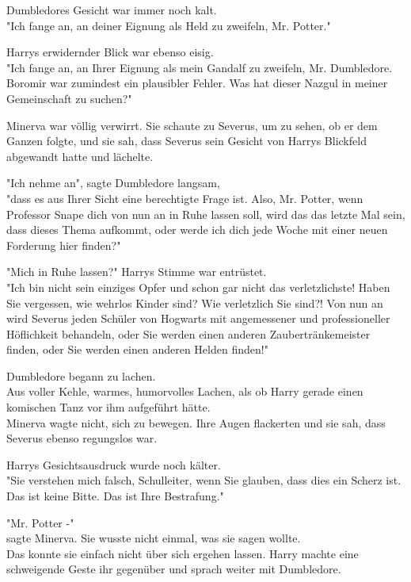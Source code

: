 {Dumbledores Gesicht war immer noch kalt.\\ "Ich fange an, an deiner Eignung als Held zu zweifeln, Mr. Potter."

Harrys erwidernder Blick war ebenso eisig.\\ "Ich fange an, an Ihrer Eignung als mein Gandalf zu zweifeln, Mr. Dumbledore. Boromir war zumindest ein plausibler Fehler. Was hat dieser Nazgul in meiner Gemeinschaft zu suchen?"

Minerva war völlig verwirrt. Sie schaute zu Severus, um zu sehen, ob er dem Ganzen folgte, und sie sah, dass Severus sein Gesicht von Harrys Blickfeld abgewandt hatte und lächelte.

"Ich nehme an", sagte Dumbledore langsam,\\ "dass es aus Ihrer Sicht eine berechtigte Frage ist. Also, Mr. Potter, wenn Professor Snape dich von nun an in Ruhe lassen soll, wird das das letzte Mal sein, dass dieses Thema aufkommt, oder werde ich dich jede Woche mit einer neuen Forderung hier finden?"

"Mich in Ruhe lassen?" Harrys Stimme war entrüstet.\\ "Ich bin nicht sein einziges Opfer und schon gar nicht das verletzlichste! Haben Sie vergessen, wie wehrlos Kinder sind? Wie verletzlich Sie sind?! Von nun an wird Severus jeden Schüler von Hogwarts mit angemessener und professioneller Höflichkeit behandeln, oder Sie werden einen anderen Zaubertränkemeister finden, oder Sie werden einen anderen Helden finden!"

Dumbledore begann zu lachen.\\ Aus voller Kehle, warmes, humorvolles Lachen, als ob Harry gerade einen komischen Tanz vor ihm aufgeführt hätte.\\ Minerva wagte nicht, sich zu bewegen. Ihre Augen flackerten und sie sah, dass Severus ebenso regungslos war.

Harrys Gesichtsausdruck wurde noch kälter.\\ "Sie verstehen mich falsch, Schulleiter, wenn Sie glauben, dass dies ein Scherz ist.\\ Das ist keine Bitte. Das ist Ihre Bestrafung."

"Mr. Potter -"\\ sagte Minerva. Sie wusste nicht einmal, was sie sagen wollte.\\ Das konnte sie einfach nicht über sich ergehen lassen. Harry machte eine schweigende Geste ihr gegenüber und sprach weiter mit Dumbledore.

}
